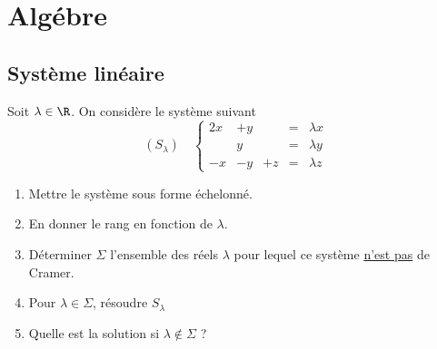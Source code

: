 \section{Algébre}


\subsection{Système linéaire}


\begin{exercice}
Soit $\lambda \in \R$. On considère le système suivant 
$$(S_\lambda)\quad  \left\{ \begin{array}{ccccc}
2x &+y& & =& \lambda x\\
 &y & & =& \lambda y \\
 -x&-y&+z&=&\lambda z
\end{array}\right. $$

\begin{enumerate}
\item Mettre le système sous forme échelonné. 
\item En donner le rang en fonction de $\lambda$. 
\item Déterminer $\Sigma$ l'ensemble des réels $\lambda$ pour lequel ce système \underline{n'est pas} de Cramer. 
\item Pour $\lambda \in \Sigma$, résoudre $S_\lambda$
\item Quelle est la solution si $\lambda \notin \Sigma$ ? 
\end{enumerate}
\end{exercice}
